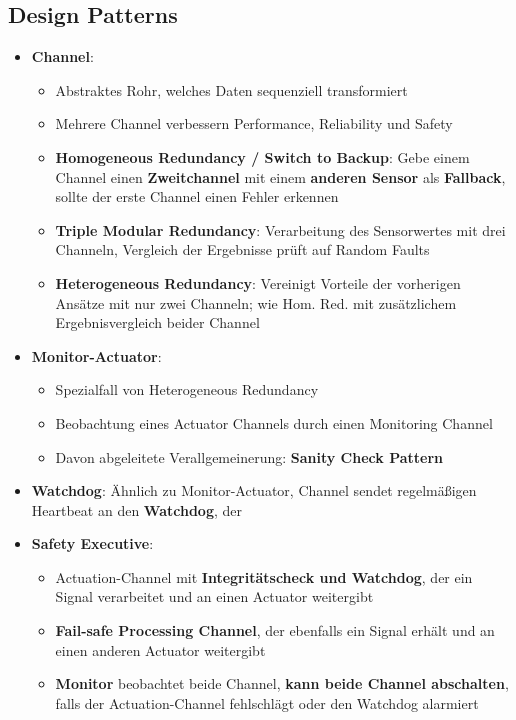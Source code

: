 \subsection{Design Patterns}
\label{rtdp:sub:design_patterns}

\begin{itemize}
	\item \textbf{Channel}:
	\begin{itemize}
		\item Abstraktes Rohr, welches Daten sequenziell transformiert
		\item Mehrere Channel verbessern Performance, Reliability und Safety
		\item \textbf{Homogeneous Redundancy / Switch to Backup}: Gebe einem Channel einen \textbf{Zweitchannel} mit einem \textbf{anderen Sensor} als \textbf{Fallback}, sollte der erste Channel einen Fehler erkennen
		\item \textbf{Triple Modular Redundancy}: Verarbeitung des Sensorwertes mit drei Channeln, Vergleich der Ergebnisse prüft auf Random Faults
		\item \textbf{Heterogeneous Redundancy}: Vereinigt Vorteile der vorherigen Ansätze mit nur zwei Channeln; wie Hom. Red. mit zusätzlichem Ergebnisvergleich beider Channel
	\end{itemize}
	\item \textbf{Monitor-Actuator}:
	\begin{itemize}
		\item Spezialfall von Heterogeneous Redundancy
		\item Beobachtung eines Actuator Channels durch einen Monitoring Channel
		\item Davon abgeleitete Verallgemeinerung: \textbf{Sanity Check Pattern}
	\end{itemize}
	\item \textbf{Watchdog}: Ähnlich zu Monitor-Actuator, Channel sendet regelmäßigen Heartbeat an den \textbf{Watchdog}, der 
	\item \textbf{Safety Executive}:
	\begin{itemize}
		\item Actuation-Channel mit \textbf{Integritätscheck und Watchdog}, der ein Signal verarbeitet und an einen Actuator weitergibt
		\item \textbf{Fail-safe Processing Channel}, der ebenfalls ein Signal erhält und an einen anderen Actuator weitergibt
		\item \textbf{Monitor} beobachtet beide Channel, \textbf{kann beide Channel abschalten}, falls der Actuation-Channel fehlschlägt oder den Watchdog alarmiert
	\end{itemize}
\end{itemize}